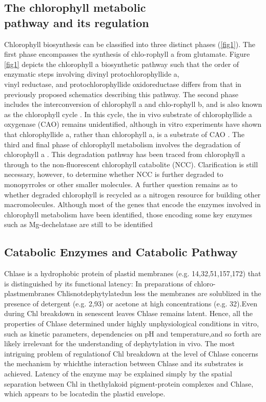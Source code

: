 \documentclass[a4paper, twocolumn, 11pt]{article}
\begin{document}
	\subsection{The chlorophyll metabolic\\ pathway and its regulation} 
	Chlorophyll biosynthesis can be classified into three distinct phases (\ref{fig1}). The first phase encompasses the synthesis of chlo-rophyll a from glutamate. Figure \ref{fig1} depicts the chlorophyll a biosynthetic pathway such that the order of enzymatic steps involving divinyl protochlorophyllide a, \\vinyl reductase, and protochlorophyllide oxidoreductase differs from that in previously proposed schematics describing this pathway. The second phase includes the interconversion of chlorophyll a and chlo-rophyll b, and is also known as the chlorophyll cycle \cite{Rudiger2002}. In this cycle, the in vivo substrate of chlorophyllide a oxygenase (CAO) remains unidentified, although in vitro experiments have shown that chlorophyllide a, rather than chlorophyll a, is a substrate of CAO \cite{Oster2000}. The third and final phase of chlorophyll metabolism involves the degradation of chlorophyll a \cite{Takamiya2000}. This degradation pathway has been traced from chlorophyll a through to the non-fluorescent chlorophyll catabolite (NCC). Clarification is still necessary, however, to determine whether NCC is further degraded to monopyrroles or other smaller molecules. A further question remains as to whether degraded chlorophyll is recycled as a nitrogen resource for building other macromolecules. Although most of the genes that encode the enzymes involved in chlorophyll metabolism have been identified, those encoding some key enzymes such as Mg-dechelatase are still to be identified \cite{Tanaka2006}
	
	\subsection{Catabolic Enzymes and Catabolic Pathway}
	Chlase is a hydrophobic protein of plastid membranes (e.g. 14,32,51,157,172) that is distinguished by its functional latency: In preparations of chloro-plastmembranes Chlisnotdephytylatedun less the membranes are solublized in the presence of detergent (e.g. 2,93) or acetone at high concentrations (e.g. 32).Even during Chl breakdown in senescent leaves Chlase remains latent. Hence, all the properties of Chlase determined under highly unphysiological conditions in vitro, such as kinetic parameters, dependencies on pH and temperature,and so forth are likely irrelevant for the understanding of dephytylation in vivo. The most intriguing problem of regulationof Chl breakdown at the level of Chlase concerns the mechanism by whichthe interaction between Chlase and its substrates is achieved. Latency of the enzyme may be explained simply by the spatial separation between Chl in thethylakoid pigment-protein complexes and Chlase, which appears to be locatedin the plastid envelope.\\
	
\end{document}
